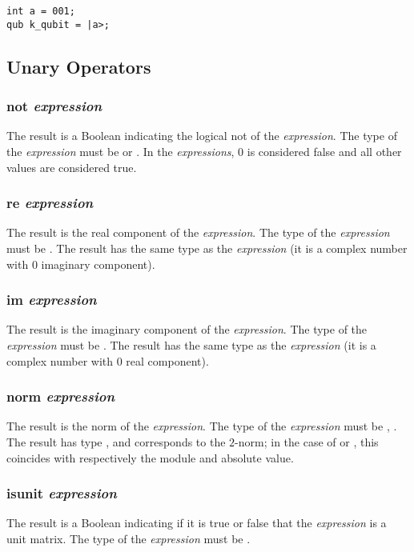 \begin{lstlisting}
int a = 001;
qub k_qubit = |a>;
\end{lstlisting}

\subsection{Unary Operators}
\subsubsection{not \textit{expression}}
The result is a Boolean indicating the logical \textsf{not} of the \textit{expression}. The type of the \textit{expression} must be \integ or \float. In the \textit{expressions}, 0 is considered false and all other values are considered true.
\subsubsection{re \textit{expression}}
The result is the real component of the \textit{expression}. The type of the \textit{expression} must be  \complex. The result has the same type as the \textit{expression} (it is a complex number with  0 imaginary component).
\subsubsection{im \textit{expression}}
The result is the imaginary component of the \textit{expression}. The type of the \textit{expression} must be  \complex. The result has the same type as the \textit{expression} (it is a complex number with  0 real component).
\subsubsection{norm \textit{expression}}
The result is the norm of the \textit{expression}. The type of the \textit{expression} must be \mat, . The result has type \float, and corresponds to the $2$-norm; in the case of \complex or \float, this coincides with respectively the module and absolute value.
\subsubsection{isunit \textit{expression}}
The result is a Boolean indicating if it is true or false that the \textit{expression} is a unit matrix. The type of the \textit{expression} must be \mat.
